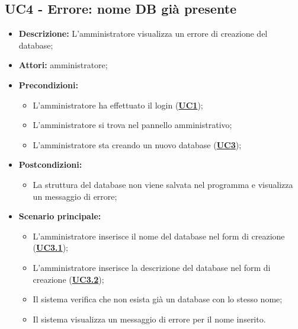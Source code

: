 \documentclass[5pt]{article}
\begin{document}
\subsection{UC4 - Errore: nome DB già presente}
\label{sec:UC4}
\begin{itemize}
	\item \textbf{Descrizione:} L’amministratore visualizza un errore di creazione del database;
	\item \textbf{Attori:} amministratore;
	\item \textbf{Precondizioni:} 
	\begin{itemize}
		\item L’amministratore ha effettuato il login (\hyperref[sec:UC1]{\textbf{UC1}});
		\item L’amministratore si trova nel pannello amministrativo;
		\item L’amministratore sta creando un nuovo database (\hyperref[sec:UC3]{\textbf{UC3}});
	\end{itemize}
	\item \textbf{Postcondizioni:} 
	\begin{itemize}
		\item La struttura del database non viene salvata nel programma e visualizza un messaggio di errore;
	\end{itemize}
	\item \textbf{Scenario principale:} 
	\begin{itemize}
		\item L’amministratore inserisce il nome del database nel form di creazione (\hyperref[sec:UC3.1]{\textbf{UC3.1}});
		\item L’amministratore inserisce la descrizione del database nel form di creazione (\hyperref[sec:UC3.2]{\textbf{UC3.2}});
		\item Il sistema verifica che non esista già un database con lo stesso nome;
		\item Il sistema visualizza un messaggio di errore per il nome inserito.
	\end{itemize}
\end{itemize}
\end{document}
